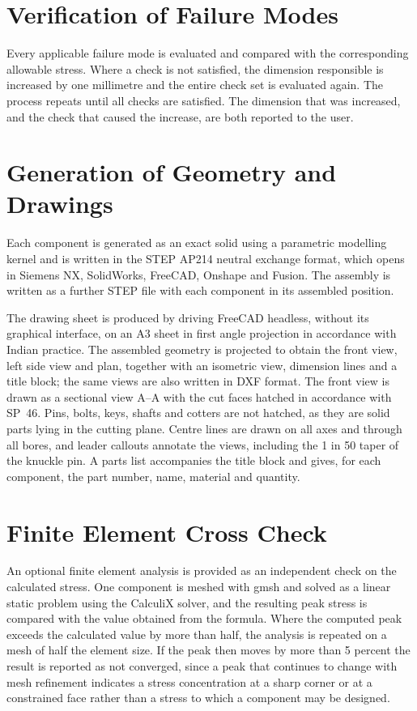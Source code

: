 \section{Verification of Failure Modes}
Every applicable failure mode is evaluated and compared with the corresponding allowable stress. Where a check is not satisfied, the dimension responsible is increased by one millimetre and the entire check set is evaluated again. The process repeats until all checks are satisfied. The dimension that was increased, and the check that caused the increase, are both reported to the user.

\section{Generation of Geometry and Drawings}
Each component is generated as an exact solid using a parametric modelling kernel and is written in the STEP AP214 neutral exchange format, which opens in Siemens NX, SolidWorks, FreeCAD, Onshape and Fusion. The assembly is written as a further STEP file with each component in its assembled position.

The drawing sheet is produced by driving FreeCAD headless, without its graphical interface, on an A3 sheet in first angle projection in accordance with Indian practice. The assembled geometry is projected to obtain the front view, left side view and plan, together with an isometric view, dimension lines and a title block; the same views are also written in DXF format. The front view is drawn as a sectional view A--A with the cut faces hatched in accordance with SP~46. Pins, bolts, keys, shafts and cotters are not hatched, as they are solid parts lying in the cutting plane. Centre lines are drawn on all axes and through all bores, and leader callouts annotate the views, including the 1 in 50 taper of the knuckle pin. A parts list accompanies the title block and gives, for each component, the part number, name, material and quantity.

\section{Finite Element Cross Check}
An optional finite element analysis is provided as an independent check on the calculated stress. One component is meshed with gmsh and solved as a linear static problem using the CalculiX solver, and the resulting peak stress is compared with the value obtained from the formula. Where the computed peak exceeds the calculated value by more than half, the analysis is repeated on a mesh of half the element size. If the peak then moves by more than 5 percent the result is reported as not converged, since a peak that continues to change with mesh refinement indicates a stress concentration at a sharp corner or at a constrained face rather than a stress to which a component may be designed.

